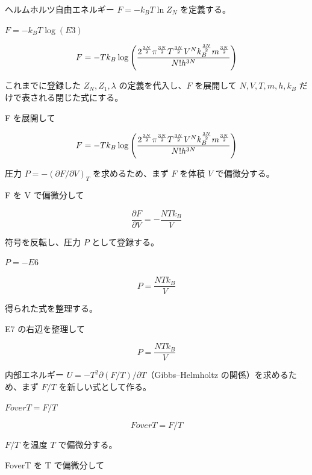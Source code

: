 \documentclass[dvipdfmx,a4paper,11pt]{jsarticle}
\begin{document}
ヘルムホルツ自由エネルギー $F=-k_BT\ln Z_N$ を定義する。

$F = -k_B T \log(E3)$

\begin{equation}
  F = -T k_{B} \log \left({{2^{\frac{3 N}{2}} \pi^{\frac{3 N}{2}} T^{\frac{3 N}{2}} V^{N} k_{B}^{\frac{3 N}{2}} m^{\frac{3 N}{2}}}\over{N! h^{3 N}}}\right)
  \label{eq:E4}
\end{equation}

これまでに登録した $Z_N,Z_1,\lambda$ の定義を代入し、$F$ を展開して $N,V,T,m,h,k_B$ だけで表される閉じた式にする。

F を展開して

\begin{equation}
  F = -T k_{B} \log \left({{2^{\frac{3 N}{2}} \pi^{\frac{3 N}{2}} T^{\frac{3 N}{2}} V^{N} k_{B}^{\frac{3 N}{2}} m^{\frac{3 N}{2}}}\over{N! h^{3 N}}}\right)
  \label{eq:E5}
\end{equation}

圧力 $P=-(\partial F/\partial V)_T$ を求めるため、まず $F$ を体積 $V$ で偏微分する。

F を V で偏微分して

\begin{equation}
  \frac{\partial F}{\partial V} = -\frac{N T k_{B}}{V}
  \label{eq:E6}
\end{equation}

符号を反転し、圧力 $P$ として登録する。

$P = -E6$

\begin{equation}
  P = \frac{N T k_{B}}{V}
  \label{eq:E7}
\end{equation}

得られた式を整理する。

E7 の右辺を整理して

\begin{equation}
  P = \frac{N T k_{B}}{V}
  \label{eq:E8}
\end{equation}

内部エネルギー $U=-T^2\partial(F/T)/\partial T$（Gibbs–Helmholtz の関係）を求めるため、まず $F/T$ を新しい式として作る。

$FoverT = F / T$

\begin{equation}
  FoverT = F / T
  \label{eq:E9}
\end{equation}

$F/T$ を温度 $T$ で偏微分する。

FoverT を T で偏微分して
\end{document}

